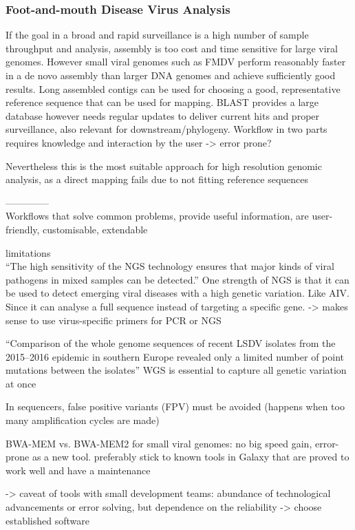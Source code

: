 \subsubsection*{Foot-and-mouth Disease Virus Analysis}
If the goal in a broad and rapid surveillance is a high number of sample throughput and analysis, assembly is too cost and time sensitive for large viral genomes. However small viral genomes such as FMDV perform reasonably faster in a de novo assembly than larger DNA genomes and achieve sufficiently good results. Long assembled contigs can be used for choosing a good, representative reference sequence that can be used for mapping. BLAST provides a large database however needs regular updates to deliver current hits and proper surveillance, also relevant for downstream/phylogeny.
Workflow in two parts requires knowledge and interaction by the user -> error prone?

Nevertheless this is the most suitable approach for high resolution genomic analysis, as a direct mapping fails due to not fitting reference sequences

--------------\\
Workflows that solve common problems, provide useful information, are user-friendly, customisable, extendable

limitations \\

``The high sensitivity of the \ac{NGS} technology ensures that major kinds of viral pathogens in mixed samples can be detected.''
One strength of \ac{NGS} is that it can be used to detect emerging viral diseases with a high genetic variation. Like \ac{AIV}. Since it can analyse a full sequence instead of targeting a specific gene. -> makes sense to use virus-specific primers for \ac{PCR} or \ac{NGS} 

``Comparison of the whole genome sequences of recent \ac{LSDV} isolates from the 2015–2016 epidemic in southern Europe revealed only a limited number of point mutations between the isolates'' \ac{WGS} is essential to capture all genetic variation at once

In sequencers, false positive variants (\ac{FPV}) must be avoided (happens when too many amplification cycles are made)

BWA-MEM vs. BWA-MEM2 for small viral genomes: no big speed gain, error-prone as a new tool. preferably stick to known tools in Galaxy that are proved to work well and have a maintenance

-> caveat of tools with small development teams: abundance of technological advancements or error solving, but dependence on the reliability -> choose established software


